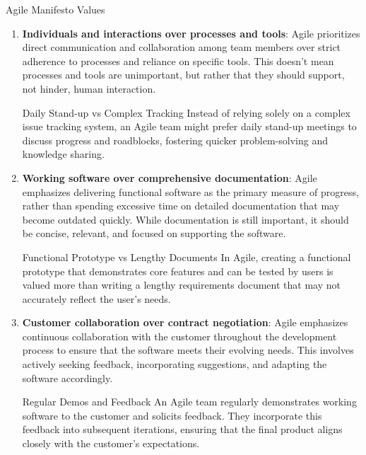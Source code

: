 

\begin{conceptcard}{Agile Manifesto Values}
  \begin{enumerate}
    \item \textbf{Individuals and interactions over processes and tools}: Agile prioritizes direct communication and collaboration among team members over strict adherence to processes and reliance on specific tools. This doesn't mean processes and tools are unimportant, but rather that they should support, not hinder, human interaction.

          \begin{examplecard}{Daily Stand-up vs Complex Tracking}
            Instead of relying solely on a complex issue tracking system, an Agile team might prefer daily stand-up meetings to discuss progress and roadblocks, fostering quicker problem-solving and knowledge sharing.
          \end{examplecard}

    \item \textbf{Working software over comprehensive documentation}: Agile emphasizes delivering functional software as the primary measure of progress, rather than spending excessive time on detailed documentation that may become outdated quickly. While documentation is still important, it should be concise, relevant, and focused on supporting the software.

          \begin{examplecard}{Functional Prototype vs Lengthy Documents}
            In Agile, creating a functional prototype that demonstrates core features and can be tested by users is valued more than writing a lengthy requirements document that may not accurately reflect the user's needs.
          \end{examplecard}

    \item \textbf{Customer collaboration over contract negotiation}: Agile emphasizes continuous collaboration with the customer throughout the development process to ensure that the software meets their evolving needs. This involves actively seeking feedback, incorporating suggestions, and adapting the software accordingly.

          \begin{examplecard}{Regular Demos and Feedback}
            An Agile team regularly demonstrates working software to the customer and solicits feedback. They incorporate this feedback into subsequent iterations, ensuring that the final product aligns closely with the customer's expectations.
          \end{examplecard}


\end{enumerate}
\end{conceptcard}
